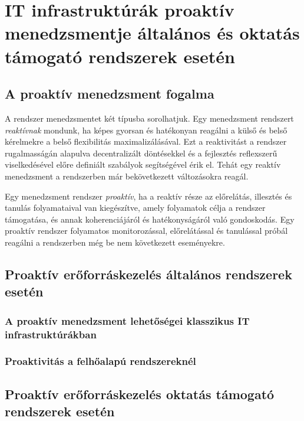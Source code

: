 \chapter{IT infrastruktúrák proaktív menedzsmentje általános és oktatás támogató rendszerek esetén}

\section{A proaktív menedzsment fogalma}

A rendszer menedzsmentet két típusba sorolhatjuk.  Egy menedzsment rendszert \textit{reaktívnak} mondunk, ha képes gyorsan és hatékonyan reagálni a külső és belső kérelmekre a belső flexibilitás maximalizálásával. Ezt a reaktivitást a rendszer rugalmasságán alapulva decentralizált döntésekkel és a fejlesztés reflexszerű viselkedésével előre definiált szabályok segítségével érik el.\cite{aftsarapms} Tehát egy reaktív menedzsment a rendszerben már bekövetkezett változásokra reagál.

Egy menedzsment rendszer \textit{proaktív}, ha a reaktív része az előrelátás, illesztés és tanulás folyamataival van kiegészítve, amely folyamatok célja a rendszer támogatása, és annak koherenciájáról és hatékonyságáról való gondoskodás. Egy proaktív rendszer folyamatos monitorozással, előrelátással és tanulással próbál reagálni a rendszerben még be nem következett eseményekre.

\section{Proaktív erőforráskezelés általános rendszerek esetén}

\subsection{A proaktív menedzsment lehetőségei klasszikus IT infrastruktúrákban}


\subsection{Proaktivitás a felhőalapú rendszereknél}


\section{Proaktív erőforráskezelés oktatás támogató rendszerek esetén}


